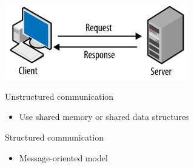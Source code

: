 \begin{slide}


    \includegraphics[width=80mm]{client-server-model.png}
    \bigskip

    Unstructured communication 
    \begin{itemize}
        \item Use shared memory or shared data structures
    \end{itemize}

    Structured communication 
    \begin{itemize}
        \item Message-oriented model
    \end{itemize}

\end{slide}


